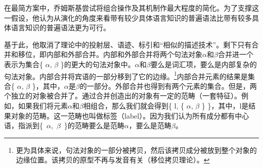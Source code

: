 在最简方案中，乔姆斯基尝试将组合操作及其机制作最大程度的简化。为了支撑这一假设，他认为从演化的角度来看带有较少具体语言知识的普遍语法比带有较多具体语言知识的普遍语法更为可行\citep[]{Chomsky2008a}。

基于此，他取消了\xbarc 理论中的投射层、语迹、标引和“相似的描述技术”\citep[]{Chomsky2008a}。剩下只有合并和移位，即内部和外部合并。内部和外部合并将两个句法对象$\alpha$和$\beta$合并进一个表示为集合\{ $\alpha$, $\beta$ \}的更大的句法对象中。$\alpha$和$\beta$要么是词汇项，要么是内部复杂的句法对象。内部合并将宾语的一部分移到了它的边缘。\footnote{%
更为具体来说，句法对象的一部分被拷贝，然后该拷贝成分被放到整个对象的边缘位置。该拷贝的原型不再与发音有关（移位拷贝理论）。
}内部合并元素的结果是集合\{ $\alpha$, $\beta$ \}，其中，$\alpha$是$\beta$的一部分。外部合并也得到有两个元素的集合。但是，两个独立的对象被合并了。通过合并创造出的对象有一定的范畴（一套特征）。例如，如果我们将元素$\alpha$和$\beta$相组合，那么我们就会得到\{ l, \{ $\alpha$, $\beta$ \} \}，其中，l是结果对象的范畴。这一范畴也叫做标签（label）。因为我们认为所有成分都有中心语，指派到\{~$\alpha$,~$\beta$~\}的范畴要么是范畴$\alpha$，要么是范畴$\beta$。

